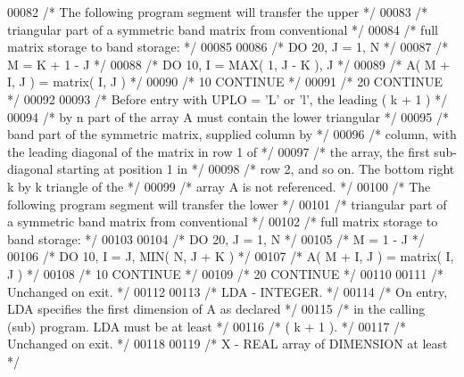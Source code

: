 \begin{DoxyCode}
00082 \textcolor{comment}{/*           The following program segment will transfer the upper */}
00083 \textcolor{comment}{/*           triangular part of a symmetric band matrix from conventional */}
00084 \textcolor{comment}{/*           full matrix storage to band storage: */}
00085 
00086 \textcolor{comment}{/*                 DO 20, J = 1, N */}
00087 \textcolor{comment}{/*                    M = K + 1 - J */}
00088 \textcolor{comment}{/*                    DO 10, I = MAX( 1, J - K ), J */}
00089 \textcolor{comment}{/*                       A( M + I, J ) = matrix( I, J ) */}
00090 \textcolor{comment}{/*              10    CONTINUE */}
00091 \textcolor{comment}{/*              20 CONTINUE */}
00092 
00093 \textcolor{comment}{/*           Before entry with UPLO = 'L' or 'l', the leading ( k + 1 ) */}
00094 \textcolor{comment}{/*           by n part of the array A must contain the lower triangular */}
00095 \textcolor{comment}{/*           band part of the symmetric matrix, supplied column by */}
00096 \textcolor{comment}{/*           column, with the leading diagonal of the matrix in row 1 of */}
00097 \textcolor{comment}{/*           the array, the first sub-diagonal starting at position 1 in */}
00098 \textcolor{comment}{/*           row 2, and so on. The bottom right k by k triangle of the */}
00099 \textcolor{comment}{/*           array A is not referenced. */}
00100 \textcolor{comment}{/*           The following program segment will transfer the lower */}
00101 \textcolor{comment}{/*           triangular part of a symmetric band matrix from conventional */}
00102 \textcolor{comment}{/*           full matrix storage to band storage: */}
00103 
00104 \textcolor{comment}{/*                 DO 20, J = 1, N */}
00105 \textcolor{comment}{/*                    M = 1 - J */}
00106 \textcolor{comment}{/*                    DO 10, I = J, MIN( N, J + K ) */}
00107 \textcolor{comment}{/*                       A( M + I, J ) = matrix( I, J ) */}
00108 \textcolor{comment}{/*              10    CONTINUE */}
00109 \textcolor{comment}{/*              20 CONTINUE */}
00110 
00111 \textcolor{comment}{/*           Unchanged on exit. */}
00112 
00113 \textcolor{comment}{/*  LDA    - INTEGER. */}
00114 \textcolor{comment}{/*           On entry, LDA specifies the first dimension of A as declared */}
00115 \textcolor{comment}{/*           in the calling (sub) program. LDA must be at least */}
00116 \textcolor{comment}{/*           ( k + 1 ). */}
00117 \textcolor{comment}{/*           Unchanged on exit. */}
00118 
00119 \textcolor{comment}{/*  X      - REAL             array of DIMENSION at least */}

\end{DoxyCode}
